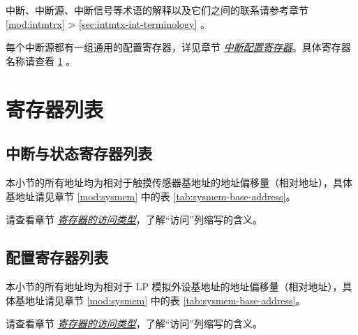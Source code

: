 \documentclass[main\_\_CN.tex]{subfiles}
\begin{document}
\begin{tiplisting}
中断、中断源、中断信号等术语的解释以及它们之间的联系请参考章节 \ref{mod:intmtrx} \textit{} > \ref{sec:intmtx-int-terminology} \textit{}。
\end{tiplisting}

每个中断源都有一组通用的配置寄存器，详见章节 \hyperref[interrupt-config-registers]{\textit{中断配置寄存器}}。具体寄存器名称请查看 \ref{sec:tchsen-reg-summ} \textit{}。





\newpage
\begin{landscape}
\hypertarget{tchsen-reg-summ}{}
\section{寄存器列表}
\label{sec:tchsen-reg-summ}

\subsection{中断与状态寄存器列表}
\label{sec:tchsen-status-reg-summ}

本小节的所有地址均为相对于触摸传感器基地址的地址偏移量（相对地址），具体基地址请见章节 \ref{mod:sysmem} \textit{} 中的表 \ref{tab:sysmem-base-address}。

请查看章节 \hyperref[glossary-access-types]{\textit{寄存器的访问类型}}，了解“访问”列缩写的含义。



\subsection{配置寄存器列表}
\label{sec:tchsen-config-reg-summ}

本小节的所有地址均为相对于 LP 模拟外设基地址的地址偏移量（相对地址），具体基地址请见章节 \ref{mod:sysmem} \textit{} 中的表 \ref{tab:sysmem-base-address}。

请查看章节 \hyperref[glossary-access-types]{\textit{寄存器的访问类型}}，了解“访问”列缩写的含义。


\end{landscape}
\end{document}
